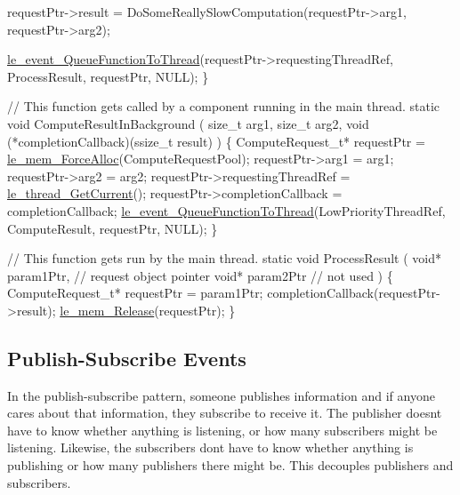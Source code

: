 \begin{DoxyCode}
    requestPtr->result = DoSomeReallySlowComputation(requestPtr->arg1, requestPtr->arg2);

    \hyperlink{le__event_loop_8h_a228da2d1f53ffa74517f108b0dcfa4d9}{le\_event\_QueueFunctionToThread}(requestPtr->requestingThreadRef,
                                   ProcessResult,
                                   requestPtr,
                                   NULL);
\}

\textcolor{comment}{// This function gets called by a component running in the main thread.}
\textcolor{keyword}{static} \textcolor{keywordtype}{void} ComputeResultInBackground
(
     \textcolor{keywordtype}{size\_t} arg1,
     \textcolor{keywordtype}{size\_t} arg2,
     \textcolor{keywordtype}{void} (*completionCallback)(ssize\_t result)
)
\{
    ComputeRequest\_t* requestPtr = \hyperlink{le__mem_8h_af7c289c73d4182835a26a9099f3db359}{le\_mem\_ForceAlloc}(ComputeRequestPool);
    requestPtr->arg1 = arg1;
    requestPtr->arg2 = arg2;
    requestPtr->requestingThreadRef = \hyperlink{le__thread_8h_a90a9d67db26f816fd1e1032d74a24fcd}{le\_thread\_GetCurrent}();
    requestPtr->completionCallback = completionCallback;
    \hyperlink{le__event_loop_8h_a228da2d1f53ffa74517f108b0dcfa4d9}{le\_event\_QueueFunctionToThread}(LowPriorityThreadRef,
                                   ComputeResult,
                                   requestPtr,
                                   NULL);
\}

\textcolor{comment}{// This function gets run by the main thread.}
\textcolor{keyword}{static} \textcolor{keywordtype}{void} ProcessResult
(
    \textcolor{keywordtype}{void}* param1Ptr, \textcolor{comment}{// request object pointer}
    \textcolor{keywordtype}{void}* param2Ptr  \textcolor{comment}{// not used}
)
\{
    ComputeRequest\_t* requestPtr = param1Ptr;
    completionCallback(requestPtr->result);
    \hyperlink{le__mem_8h_a6d8e3fe430bcb81efe97b57ce30ef2de}{le\_mem\_Release}(requestPtr);
\}
\end{DoxyCode}
\hypertarget{c_event_loop_c_event_publishSubscribe}{}\subsection{Publish-\/\+Subscribe Events}\label{c_event_loop_c_event_publishSubscribe}
In the publish-\/subscribe pattern, someone publishes information and if anyone cares about that information, they subscribe to receive it. The publisher doesn\textquotesingle{}t have to know whether anything is listening, or how many subscribers might be listening. Likewise, the subscribers don\textquotesingle{}t have to know whether anything is publishing or how many publishers there might be. This decouples publishers and subscribers.

